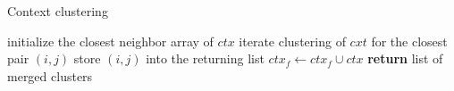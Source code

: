 \begin{description}
	\begin{algorithm}
	\caption{Context clustering}
	\label{alg03:context}
	\begin{algorithmic}[1]
		 
		\State initialize the closest neighbor array of $ctx$ 
		\State iterate clustering of $cxt$ for the closest pair $(i,j)$
		\State store $(i,j)$ into the returning list
		\EndWhile
		\State $ctx_f \gets ctx_f \cup ctx$ 
		\EndFor
		\State \textbf{return} list of merged clusters
		\EndProcedure
	\end{algorithmic}
\end{algorithm}

\end{description}





 
